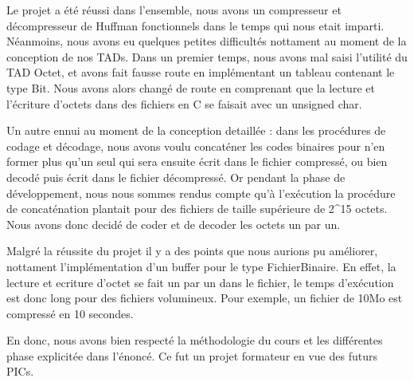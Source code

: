 Le projet a \'{e}t\'{e} réussi dans l'ensemble, nous avons un compresseur et décompresseur de Huffman fonctionnels dans le temps qui nous etait imparti. \\

N\'{e}anmoins, nous avons eu quelques petites difficultés nottament au moment de la conception de nos TADs. Dans un premier temps, nous avons mal saisi l'utilité du TAD Octet, et avons fait fausse route en impl\'{e}mentant un tableau contenant le type Bit. Nous avons alors chang\'{e} de route en comprenant que la lecture et l'\'{e}criture d'octets dans des fichiers en C se faisait avec un unsigned char.

Un autre ennui au moment de la conception detaill\'{e}e : dans les proc\'{e}dures de codage et d\'{e}codage, nous avons voulu concat\'{e}ner les codes binaires pour n'en former plus qu'un seul qui sera ensuite \'{e}crit dans le fichier compress\'{e}, ou bien decodé puis \'{e}crit dans le fichier d\'{e}compress\'{e}. Or pendant la phase de d\'{e}veloppement, nous nous sommes rendus compte qu'à l'ex\'{e}cution la proc\'{e}dure de concat\'{e}nation plantait pour des fichiers de taille sup\'{e}rieure de 2\^{}15 octets. Nous avons donc decid\'{e} de coder et de decoder les octets un par un.

Malgr\'{e} la r\'{e}ussite du projet il y a des points que nous aurions pu am\'{e}liorer, nottament l'impl\'{e}mentation d'un buffer pour le type FichierBinaire. En effet, la lecture et ecriture d'octet se fait un par un dans le fichier, le temps d'ex\'{e}cution est donc long pour des fichiers volumineux. Pour exemple, un fichier de 10Mo est compress\'{e} en 10 secondes.

En donc, nous avons bien respect\'{e} la m\'{e}thodologie du cours et les diff\'{e}rentes phase explicit\'{e}e dans l'\'{e}nonc\'{e}. Ce fut un projet formateur en vue des futurs PICs.
